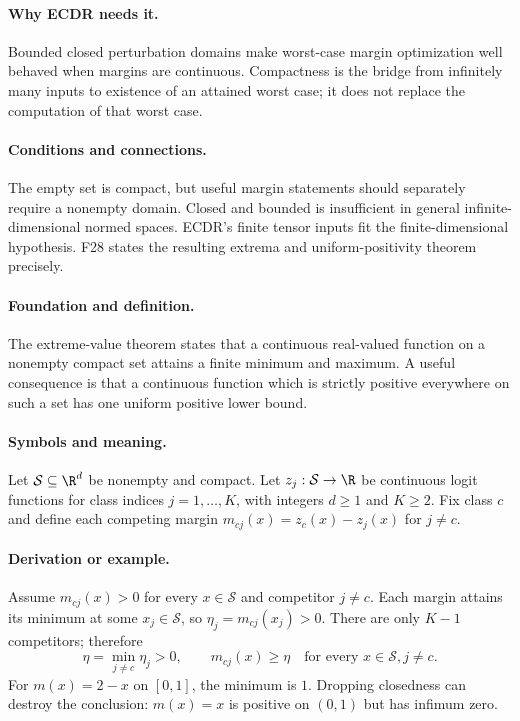 \paragraph{Why ECDR needs it.}
Bounded closed perturbation domains make worst-case margin optimization
well behaved when margins are continuous. Compactness is the bridge
from infinitely many inputs to existence of an attained worst case;
it does not replace the computation of that worst case.
\paragraph{Conditions and connections.}
The empty set is compact, but useful margin statements should separately
require a nonempty domain. Closed and bounded is insufficient in
general infinite-dimensional normed spaces. ECDR's finite tensor inputs
fit the finite-dimensional hypothesis. F28 states the resulting extrema
and uniform-positivity theorem precisely.

\paragraph{Foundation and definition.}
The extreme-value theorem states that a continuous real-valued function
on a nonempty compact set attains a finite minimum and maximum. A useful
consequence is that a continuous function which is strictly positive
everywhere on such a set has one uniform positive lower bound.
\paragraph{Symbols and meaning.}
Let $\mathcal S\subseteq\R^d$ be nonempty and compact. Let
$z_j:\mathcal S\to\R$ be continuous logit functions for class
indices $j=1,\ldots,K$, with integers $d\ge1$ and $K\ge2$.
Fix class $c$ and define each competing margin
$m_{cj}(x)=z_c(x)-z_j(x)$ for $j\ne c$.
\paragraph{Derivation or example.}
Assume $m_{cj}(x)>0$ for every $x\in\mathcal S$ and competitor
$j\ne c$. Each margin attains its minimum at some
$x_j\in\mathcal S$, so $\eta_j=m_{cj}(x_j)>0$. There are only
$K-1$ competitors; therefore
\[
 \eta=\min_{j\ne c}\eta_j>0,
 \qquad m_{cj}(x)\ge\eta
 \quad\text{for every }x\in\mathcal S, j\ne c.
\]
For $m(x)=2-x$ on $[0,1]$, the minimum is $1$. Dropping closedness
can destroy the conclusion: $m(x)=x$ is positive on $(0,1)$ but has
infimum zero.
